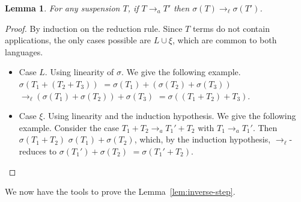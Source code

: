 \documentclass{LMCS}
\newtheorem{lemma}[theorem]{Lemma}
\newcommand{\xto}[1]{\ensuremath{\rightarrow_{#1}}}
\newcommand{\tolinred}{\xto{\ell}}
\newcommand{\toalgred}{\xto{a}}
\begin{document}
\begin{lemma}\label{lem:suspension-step}
  For any suspension $T$, if $T\toalgred T'$
  then $\sigma(T)\tolinred\sigma(T')$.
\end{lemma}
\begin{proof}
  By induction on the reduction rule. Since $T$ terms do not contain
  applications, the only cases possible are $L\cup\xi$, which are common
  to both languages.
  \begin{itemize}
    \item Case $L$. Using linearity of $\sigma$. We give the following example.
      $\sigma(T_{1}+(T_{2}+T_{3}))$
      $=\sigma(T_{1})+(\sigma(T_{2})+\sigma(T_{3}))$
      $\tolinred(\sigma(T_{1})+\sigma(T_{2}))+\sigma(T_{3})$
      $=\sigma((T_{1}+T_{2})+T_{3})$.

    \item Case $\xi$. Using linearity and the induction hypothesis. We give
      the following example. Consider the case $T_{1}+T_{2}\toalgred T_{1}'+T_{2}$
      with $T_{1}\toalgred T_{1}'$. Then 
      $\sigma(T_{1}+T_{2})$
      $\sigma(T_{1})+\sigma(T_{2})$,
      which, by the induction hypothesis, \tolinred-reduces to
      $\sigma(T_{1}')+\sigma(T_{2})$
      $=\sigma(T_{1}'+T_{2})$.
      \qedhere
  \end{itemize}
\end{proof}

We now have the tools to prove the Lemma~\ref{lem:inverse-step}.
\end{document}
